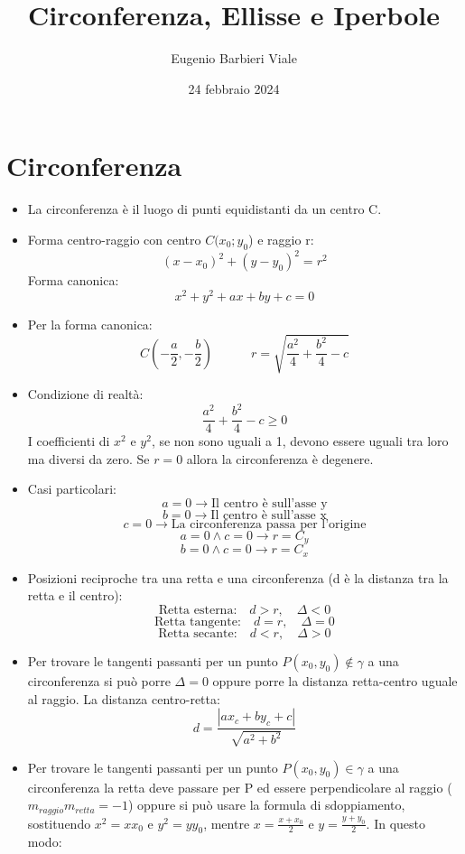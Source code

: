 \documentclass[]{article}
\title{Circonferenza, Ellisse e Iperbole}
\author{Eugenio Barbieri Viale}
\date{24 febbraio 2024}
\begin{document}
\maketitle

\section{Circonferenza}
\begin{itemize}
	\item La circonferenza è il luogo di punti equidistanti da un centro C.
	\item Forma centro-raggio con centro $C(x_0;y_0$) e raggio r:
		$$(x-x_0)^2+(y-y_0)^2=r^2$$
		Forma canonica:
		$$x^2+y^2+ax+by+c=0$$
	\item Per la forma canonica:
		$$C\left(-\frac{a}{2},-\frac{b}{2}\right) \hspace{3em} r=\sqrt{\frac{a^2}{4}+\frac{b^2}{4}-c}$$
	\item Condizione di realtà:
		$$\frac{a^2}{4}+\frac{b^2}{4}-c \ge 0$$
		I coefficienti di $x^2$ e $y^2$, se non sono uguali a 1, devono essere uguali tra loro ma diversi da zero.
		Se $r=0$ allora la circonferenza è degenere.
	\item Casi particolari:
		$$ a=0 \rightarrow \text{Il centro è sull'asse y}$$
		$$ b=0 \rightarrow \text{Il centro è sull'asse x}$$
		$$ c=0 \rightarrow \text{La circonferenza passa per l'origine}$$
		$$ a=0 \wedge c=0 \rightarrow r=C_y$$
		$$ b=0 \wedge c=0 \rightarrow r=C_x$$
	\item Posizioni reciproche tra una retta e una circonferenza (d è la distanza tra la retta e il centro):
		$$\text{Retta esterna:} \hspace{1em} d > r, \hspace{1em} \Delta < 0$$
		$$\text{Retta tangente:} \hspace{1em} d = r, \hspace{1em} \Delta = 0$$
		$$\text{Retta secante:} \hspace{1em} d < r, \hspace{1em} \Delta > 0$$
	\item Per trovare le tangenti passanti per un punto $P(x_0,y_0)\not\in\gamma$ a una circonferenza si può porre $\Delta=0$ oppure porre la distanza retta-centro uguale al raggio. La distanza centro-retta:
		$$d=\frac{|ax_c+by_c+c|}{\sqrt{a^2+b^2}}$$
	\item Per trovare le tangenti passanti per un punto $P(x_0,y_0)\in\gamma$ a una circonferenza la retta deve passare per P ed essere perpendicolare al raggio ($m_{raggio} m_{retta}=-1$) oppure si può usare la formula di sdoppiamento, sostituendo $x^2=xx_0$ e $y^2=yy_0$, mentre $x=\frac{x+x_0}{2}$ e  $y=\frac{y+y_0}{2}$. In questo modo:

\end{itemize}
\end{document}

